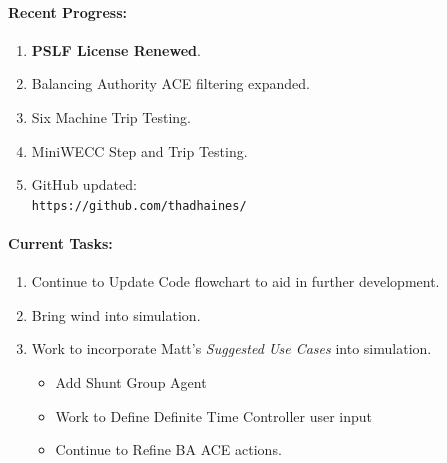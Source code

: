 \documentclass[12pt]{article}
\begin{document}
\begin{multicols}{2}
\raggedright
	\paragraph{Recent Progress:}
	\begin{enumerate}

		\item \textbf{PSLF License Renewed}.

		\item Balancing Authority ACE filtering expanded.
		\item Six Machine Trip Testing.
		\item MiniWECC Step and Trip Testing.
		


		\item GitHub updated:\\
		\verb|https://github.com/thadhaines/|
		
	\end{enumerate}
\paragraph{Current Tasks:}
	\begin{enumerate}

		\item Continue to Update Code flowchart to aid in further development.
		\item Bring wind into simulation.
		\item Work to incorporate Matt's \emph{Suggested Use Cases} into simulation.
		\begin{itemize}
		
		\item Add Shunt Group Agent
		\item Work to Define Definite Time Controller user input
		
		\item Continue to Refine BA ACE actions.

		\end{itemize}
		

	\end{enumerate}


\end{multicols}
\end{document}
